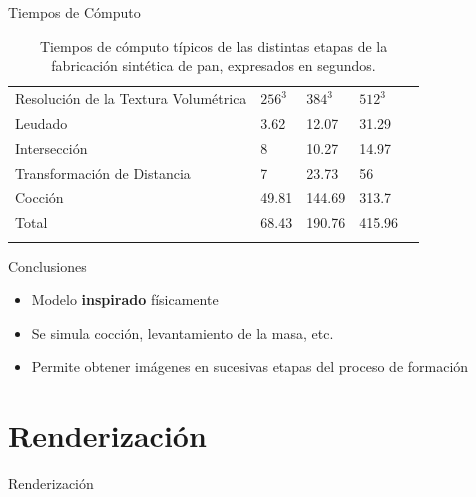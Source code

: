 \documentclass[spanish]{beamer}
\begin{document}
\begin{frame}{Tiempos de Cómputo}

\begin{table}[h!]
\begin{tabular}{lllll}
\hline\noalign{\smallskip}
Resolución de la Textura Volumétrica & $256^{3}$ & $384^{3}$  & $512^{3}$ \\
\noalign{\smallskip}\hline\noalign{\smallskip}
Leudado & 3.62 & 12.07 & 31.29 \\
Intersección & 8 & 10.27 & 14.97 \\
Transformación de Distancia & 7 & 23.73 & 56 \\
Cocción  & 49.81 & 144.69 & 313.7 \\
\hline\noalign{\smallskip}
Total & 68.43 & 190.76 & 415.96 \\
\noalign{\smallskip}\hline
\end{tabular}
\caption{Tiempos de cómputo típicos de las distintas etapas de la fabricación sintética de pan, expresados en segundos.}
\label{tab:computingtimes}
\end{table}
\end{frame}

\begin{frame}{Conclusiones}
\begin{block}{}
\begin{itemize}
\item Modelo \textbf{inspirado} físicamente
\item Se simula cocción, levantamiento de la masa, etc.
\item Permite obtener imágenes en sucesivas etapas del proceso de formación
\end{itemize}
\end{block}
\end{frame}

\section{Renderización}


\begin{frame}
\begin{block}{}
\begin{center}
\vspace{1cm}
\huge{Renderización}
\vspace{1cm}
\end{center}
\end{block}
\end{frame}
\end{document}

